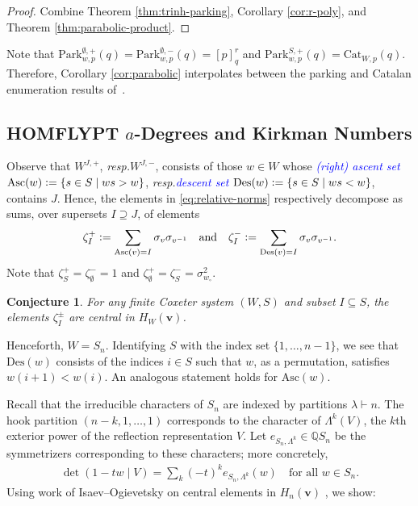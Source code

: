 \documentclass[submission]{FPSAC2025}
\newtheorem{conj}{Conjecture}
\newcommand{\dfemph}[1]{\textcolor{blue}{\emph{#1}}}
\newcommand{\m}{p}
\newcommand{\x}{\mathbf{v}}
\newcommand{\Asc}{\mathrm{Asc}}
\newcommand{\Des}{\mathrm{Des}}
\newcommand{\Cat}{\mathrm{Cat}}
\newcommand{\Park}{\mathrm{Park}}
\begin{document}
\begin{proof}
Combine Theorem \ref{thm:trinh-parking}, Corollary \ref{cor:r-poly}, and Theorem \ref{thm:parabolic-product}.
\end{proof}

Note that $\Park_{w, \m}^{\emptyset, +}(q) = \Park_{w, \m}^{\emptyset, -}(q) = [\m]_q^r$ and $\Park_{w, \m}^{S, +}(q) = \Cat_{W, \m}(q)$.
Therefore, Corollary \ref{cor:parabolic} interpolates between the parking and Catalan enumeration results of~\cite{gltw}.

\subsection{HOMFLYPT $a$-Degrees and Kirkman Numbers}\label{subsec:kirkman}

Observe that $W^{J, +}$, \emph{resp.}\@ $W^{J, -}$, consists of those $w \in W$ whose \dfemph{(right) ascent set} $\Asc(w) \vcentcolon= \{s \in S \mid ws > w\}$, \emph{resp.}\@ \dfemph{descent set} $\Des(w) \vcentcolon= \{s \in S \mid ws < w\}$, contains $J$.
Hence, the elements in \eqref{eq:relative-norms} respectively decompose as sums, over supersets $I \supseteq J$, of elements
\begin{align}
\zeta_I^+ \vcentcolon= \sum_{\Asc(v) = I} \sigma_v \sigma_{v^{-1}}
	\quad\text{and}\quad
	\zeta_I^- \vcentcolon= \sum_{\Des(v) = I} \sigma_v \sigma_{v^{-1}}.
\end{align}
Note that $\zeta_S^+ = \zeta_\emptyset^- = 1$ and $\zeta_\emptyset^+ = \zeta_S^- =\sigma_{w_\circ}^2$.

\begin{conj}
For any finite Coxeter system $(W, S)$ and subset $I \subseteq S$, the elements $\zeta_I^\pm$ are central in $H_W(\x)$.
\end{conj}

Henceforth, $W = S_n$.
Identifying $S$ with the index set $\{1, \ldots, n - 1\}$, we see that $\Des(w)$ consists of the indices $i \in S$ such that $w$, as a permutation, satisfies $w(i + 1) < w(i)$.
An analogous statement holds for $\Asc(w)$.

Recall that the irreducible characters of $S_n$ are indexed by partitions $\lambda \vdash n$.
The hook partition $(n - k, 1, \ldots, 1)$ corresponds to the character of $\Lambda^k(V)$, the $k$th exterior power of the reflection representation $V$.
Let $e_{S_n, \Lambda^k} \in \mathbb{Q}S_n$ be the symmetrizers corresponding to these characters; more concretely,
\begin{align}
\det(1 - tw \mid V) = \sum_k {(-t)^k} e_{S_n, \Lambda^k}(w)
	\quad\text{for all $w \in S_n$}.
\end{align}
Using work of Isaev--Ogievetsky on central elements in $H_n(\x)$ \cite{io}, we show:
\end{document}
